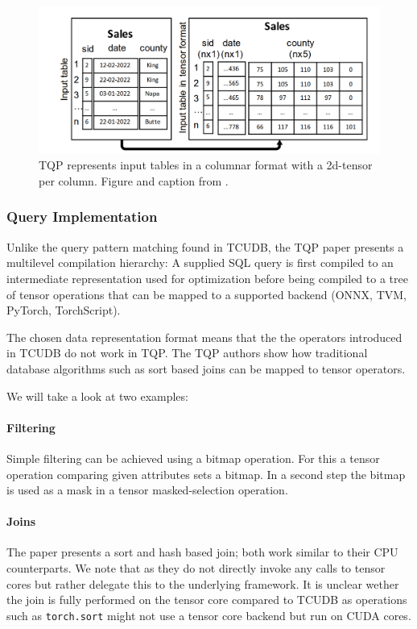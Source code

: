 \documentclass{paper}
\begin{document}
	
	\begin{figure}
		\centering
		\includegraphics[width=0.9\linewidth]{otherPaper}
		\caption{TQP represents input tables in a columnar format with a 2d-tensor per column. Figure and caption from \cite{he2022query}.}
		\label{fig:otherpaper}
	\end{figure}

\subsubsection{Query Implementation}
	
	Unlike the query pattern matching found in TCUDB, the TQP paper presents a multilevel compilation hierarchy: A supplied SQL query is first compiled to an intermediate representation used for optimization before being compiled to a tree of tensor operations that can be mapped to a supported backend (ONNX, TVM, PyTorch, TorchScript).
	
	The chosen data representation format means that the the operators introduced in TCUDB do not work in TQP. The TQP authors show how traditional database algorithms such as sort based joins can be mapped to tensor operators. 
	
	We will take a look at two examples:
	
	\paragraph{Filtering}
	Simple filtering can be achieved using a bitmap operation. For this a tensor operation comparing given attributes sets a bitmap. In a second step the bitmap is used as a mask in a tensor masked-selection operation. 

	\paragraph{Joins}
	
	The paper presents a sort and hash based join; both work similar to their CPU counterparts. We note that as they do not directly invoke any calls to tensor cores but rather delegate this to the underlying framework. It is unclear wether the join is fully performed on the tensor core compared to TCUDB as operations such as \texttt{torch.sort} might not use a tensor core backend but run on CUDA cores.
	
\end{document}
